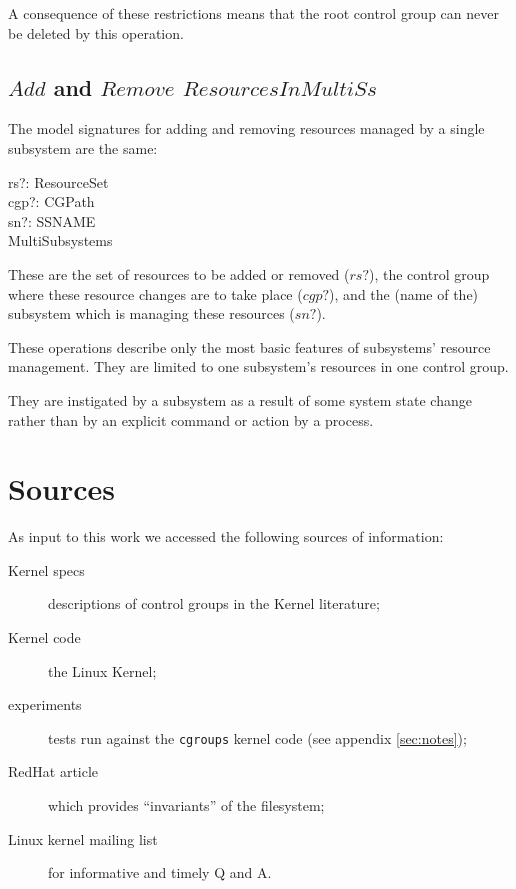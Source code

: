 \documentclass[a4paper,twoside,12pt]{article}
\begin{document}
A consequence of these restrictions means that the root control group can never be deleted by this operation.

\subsection{$Add$ and $Remove$ $ResourcesInMultiSs$}

The model signatures for adding and removing resources managed by a single subsystem are the same:

\begin{schema*}
    rs?: ResourceSet \\
    cgp?: CGPath \\
    sn?: SSNAME \\
\also
    \Delta MultiSubsystems
\end{schema*}
These are the set of resources to be added or removed ($rs?$), the control group where these resource changes are to take place ($cgp?$), 
and the (name of the) subsystem which is managing these resources ($sn?$).

These operations describe only the most basic features of subsystems' resource management.
They are limited to one subsystem's resources in one control group.

They are instigated by a subsystem as a result of some system state change rather 
than by an explicit command or action by a process.



\clearpage

\appendix




\section{Sources}
\label{sec:sources}

As input to this work we accessed the following sources of information:
\begin{description}
\item[Kernel specs] descriptions of control groups in the Kernel literature\cite{linuxgroups};
\item[Kernel code] the Linux Kernel\cite{linuxkernel};
\item[experiments] tests run against the \texttt{cgroups} kernel code (see appendix \ref{sec:notes});
\item[RedHat article] which provides ``invariants'' of the filesystem\cite{rharticle};
\item[Linux kernel mailing list] for informative and timely Q and A\cite{noop}.
\end{description}
\end{document}
